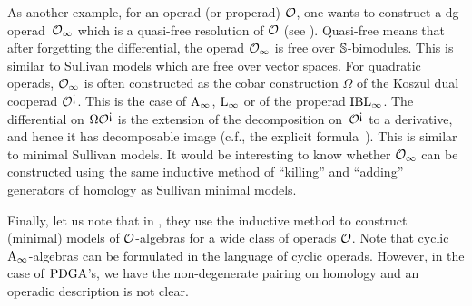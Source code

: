 \documentclass[\MainFolder/Text.tex]{subfiles}
\begin{document}
\begin{Remark}
As another example, for an operad (or properad) $\mathcal{O}$, one wants to construct a dg-operad~$\mathcal{O}_\infty$ which is a quasi-free resolution of $\mathcal{O}$ (see \cite{Vallette2012}). Quasi-free means that after forgetting the differential, the operad $\mathcal{O}_\infty$ is free over $\mathbb{S}$-bimodules. This is similar to Sullivan models which are free over vector spaces. For quadratic operads, $\mathcal{O}_\infty$ is often constructed as the cobar construction $\Omega$ of the Koszul dual cooperad $\mathcal{O}^{\mbox{!`}}$. This is the case of $\mathrm{A}_\infty$, $\mathrm{L}_\infty$ or of the properad $\mathrm{IBL}_\infty$. The differential on $\Omega \mathcal{O}^{\mbox{!`}}$ is the extension of the decomposition on~$\mathcal{O}^{\mbox{!`}}$ to a derivative, and hence it has decomposable image (c.f., the explicit formula~\cite[Formula~(2)]{Peksova2018}). This is similar to minimal Sullivan models. It would be interesting to know whether $\mathcal{O}_\infty$ can be constructed using the same inductive method of ``killing'' and ``adding'' generators of homology as Sullivan minimal models. 

Finally, let us note that in \cite{Cirici2019}, they use the inductive method to construct (minimal) models of $\mathcal{O}$-algebras for a wide class of operads $\mathcal{O}$. Note that cyclic $\mathrm{A}_\infty$-algebras can be formulated in the language of cyclic operads. However, in the case of $\mathrm{PDGA}$'s, we have the non-degenerate pairing on homology and an operadic description is not clear.
\end{Remark}
%
\end{document}
